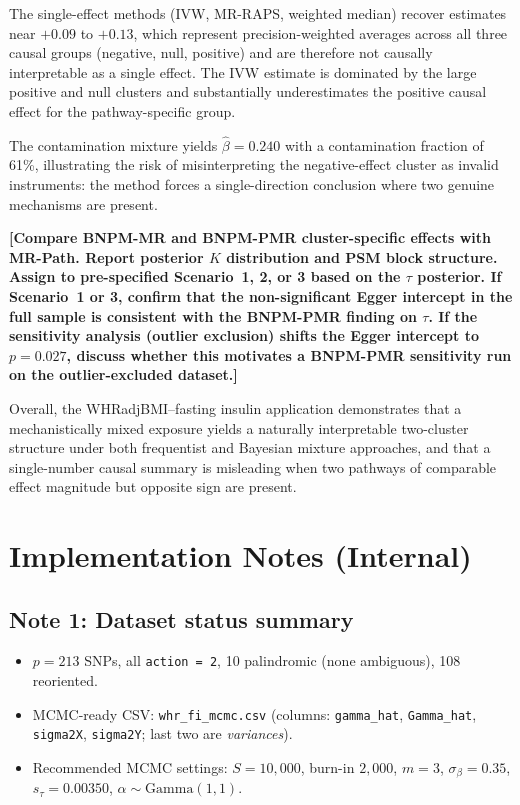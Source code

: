 \documentclass[12pt,a4paper]{article}
\newcommand{\placeholder}[1]{\textcolor{fcblue}{\textbf{[#1]}}}
\begin{document}
The single-effect methods (IVW, MR-RAPS, weighted median) recover estimates
near $+0.09$ to $+0.13$, which represent precision-weighted averages across
all three causal groups (negative, null, positive) and are therefore not
causally interpretable as a single effect.  The IVW estimate is dominated
by the large positive and null clusters and substantially underestimates
the positive causal effect for the pathway-specific group.

The contamination mixture yields $\hat\beta = 0.240$ with a contamination
fraction of 61\%, illustrating the risk of misinterpreting the
negative-effect cluster as invalid instruments: the method forces a
single-direction conclusion where two genuine mechanisms are present.

\placeholder{Compare BNPM-MR and BNPM-PMR cluster-specific effects with
MR-Path.  Report posterior $K$ distribution and PSM block structure.
Assign to pre-specified Scenario~1, 2, or 3 based on the $\tau$
posterior.  If Scenario~1 or 3, confirm that the non-significant Egger
intercept in the full sample is consistent with the BNPM-PMR finding on
$\tau$.  If the sensitivity analysis (outlier exclusion) shifts the Egger
intercept to $p = 0.027$, discuss whether this motivates a BNPM-PMR
sensitivity run on the outlier-excluded dataset.}

Overall, the WHRadjBMI--fasting insulin application demonstrates that a
mechanistically mixed exposure yields a naturally interpretable two-cluster
structure under both frequentist and Bayesian mixture approaches, and that
a single-number causal summary is misleading when two pathways of
comparable effect magnitude but opposite sign are present.

\newpage
\section*{Implementation Notes (Internal)}
\label{sec:notes}

\subsection*{Note 1: Dataset status summary}

\begin{itemize}
  \item $p = 213$ SNPs, all \texttt{action = 2}, 10 palindromic (none
        ambiguous), 108 reoriented.
  \item MCMC-ready CSV: \texttt{whr\_fi\_mcmc.csv} (columns:
        \texttt{gamma\_hat}, \texttt{Gamma\_hat}, \texttt{sigma2X},
        \texttt{sigma2Y}; last two are \emph{variances}).
  \item Recommended MCMC settings: $S = 10{,}000$, burn-in $2{,}000$,
        $m = 3$, $\sigma_\beta = 0.35$, $s_\tau = 0.00350$,
        $\alpha \sim \mathrm{Gamma}(1,1)$.
\end{itemize}
\end{document}
